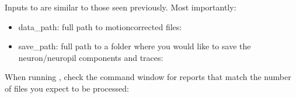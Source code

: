 \documentclass[letterpaper,10pt,english]{sphinxmanual}
\begin{document}
\sphinxAtStartPar
Inputs to {\hyperref[\detokenize{user_guide/segmentation:segmentplane}]{}} are similar to those seen previously. Most importantly:
\begin{itemize}
\item {} 
\sphinxAtStartPar
data\_path: full path to motion\sphinxhyphen{}corrected  files:

\begin{sphinxVerbatim}[commandchars=\\\{\}]
           

             
    
\end{sphinxVerbatim}

\item {} 
\sphinxAtStartPar
save\_path: full path to a folder where you would like to save the neuron/neuropil components and traces:

\begin{sphinxVerbatim}[commandchars=\\\{\}]
            
\end{sphinxVerbatim}

\end{itemize}

\sphinxAtStartPar
When running {\hyperref[\detokenize{user_guide/segmentation:segmentplane}]{}}, check the command window for reports that match the number of files you expect to be processed:
\end{document}
